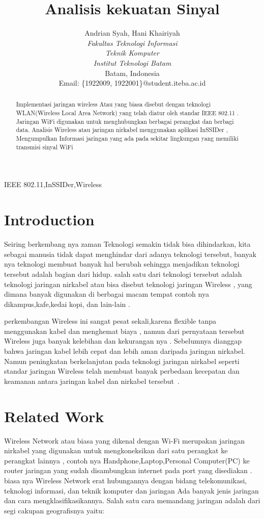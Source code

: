 \documentclass[conference]{IEEEtran}
\title{Analisis kekuatan Sinyal}
\author{Andrian Syah\IEEEauthorrefmark{1}, Hani Khairiyah\IEEEauthorrefmark{2}\\
\textit{Fakultas Teknologi Informasi}\\
\textit{Teknik Komputer}\\
\textit{Institut Teknologi Batam}\\
Batam, Indonesia\\
Email: \{\IEEEauthorrefmark{1}1922009, \IEEEauthorrefmark{2}1922001\}@student.iteba.ac.id}
\begin{document}
\maketitle

\begin{abstract}
    Implementasi jaringan wireless Atau yang biasa disebut dengan teknologi WLAN(Wireless Local Area Network) yang telah diatur oleh standar
    IEEE 802.11 . Jaringan WiFi digunakan untuk menghubungkan berbagai perangkat dan berbagi data.
    Analisis Wireless atau jaringan nirkabel menggunakan aplikasi InSSIDer ,
    Mengumpulkan Informasi jaringan yang ada pada sekitar lingkungan yang memiliki transmisi sinyal WiFi
\end{abstract}

\begin{IEEEkeywords}
    IEEE 802.11,InSSIDer,Wireless
\end{IEEEkeywords}

\section{Introduction}
Seiring berkembang nya zaman Teknologi semakin tidak bisa dihindarkan, 
kita sebagai manusia tidak dapat menghindar dari adanya teknologi tersebut,
banyak nya teknologi membuat banyak hal berubah sehingga menjadikan teknologi tersebut 
adalah bagian dari hidup. salah satu dari teknologi tersebut adalah teknologi jaringan nirkabel
atau bisa disebut teknologi jaringan Wireless , yang dimana banyak digunakan di berbagai macam tempat 
contoh nya dikampus,kafe,kedai kopi, dan lain-lain .

perkembangan Wireless ini sangat pesat sekali,karena flexible tanpa menggunakan kabel dan menghemat biaya 
, namun dari pernyataan tersebut Wireless juga banyak kelebihan dan kekurangan nya . 
Sebelumnya dianggap bahwa jaringan kabel lebih cepat dan lebih aman daripada jaringan nirkabel.
Namun peningkatan berkelanjutan pada teknologi jaringan nirkabel seperti standar jaringan Wireless
 telah membuat banyak perbedaan kecepatan dan keamanan antara jaringan kabel dan nirkabel tersebut~.
\section{Related Work}
Wireless Network atau biasa yang dikenal dengan Wi-Fi merupakan jaringan nirkabel yang digunakan
untuk mengkoneksikan dari satu perangkat ke perangkat lainnya ,
contoh nya Handphone,Laptop,Personal Computer(PC)
ke router jaringan yang sudah disambungkan internet pada port yang disediakan . biasa nya Wireless Network  
erat hubungannya dengan bidang telekomunikasi, teknologi informasi, dan teknik komputer dan jaringan 
Ada banyak jenis jaringan dan cara mengklasifikasikannya. Salah satu cara memandang jaringan adalah dari segi cakupan geografisnya yaitu:
\end{document}

